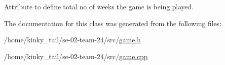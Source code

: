 Attribute to define total no of weeks the game is being played. 



The documentation for this class was generated from the following files\+:\begin{DoxyCompactItemize}
\item 
/home/kinky\+\_\+tail/se-\/02-\/team-\/24/src/\hyperlink{game_8h}{game.\+h}\item 
/home/kinky\+\_\+tail/se-\/02-\/team-\/24/src/\hyperlink{game_8cpp}{game.\+cpp}\end{DoxyCompactItemize}
